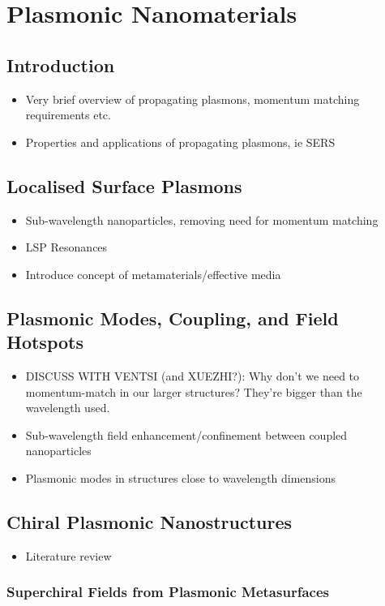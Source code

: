 \chapter{Plasmonic Nanomaterials}\label{sec:background:Plasmonics}

\section{Introduction}
\begin{itemize}
    \item Very brief overview of propagating plasmons, momentum matching requirements etc.
    \item Properties and applications of propagating plasmons, ie SERS
\end{itemize}

\section{Localised Surface Plasmons}\label{sec:background:Plasmonics:Metamaterials}
\begin{itemize}
    \item Sub-wavelength nanoparticles, removing need for momentum matching
    \item LSP Resonances
    \item Introduce concept of metamaterials/effective media
\end{itemize}

\section{Plasmonic Modes, Coupling, and Field Hotspots}
\begin{itemize}
    \item DISCUSS WITH VENTSI (and XUEZHI?): Why don't we need to momentum-match in our larger structures? They're bigger than the wavelength used.
    \item Sub-wavelength field enhancement/confinement between coupled nanoparticles
    \item Plasmonic modes in structures close to wavelength dimensions
\end{itemize}

\section{Chiral Plasmonic Nanostructures}
\begin{itemize}
    \item Literature review
\end{itemize}

\subsection{Superchiral Fields from Plasmonic Metasurfaces}